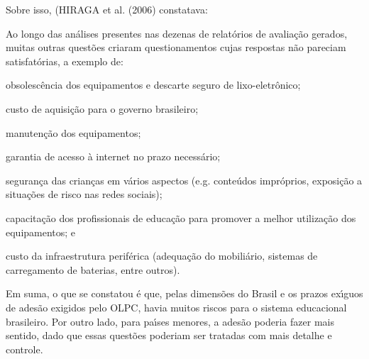 \documentclass[
12pt,		%
openright,	%
twoside,  %
a4paper,			%
chapter=TITLE,		%
english,			%
french,				%
spanish,			%
brazil				%
]{USPSC-classe/USPSC}
\begin{document}
Sobre isso, (HIRAGA et al. (2006) constatava:










\noindent\begin{center}\mbox{\centering{}}\end{center}


Ao longo das an\'alises presentes nas dezenas de relat\'orios de avalia\c{c}\~ao gerados, muitas outras quest\~oes criaram questionamentos cujas respostas n\~ao pareciam satisfat\'orias, a exemplo de:










\begin{alineas}
\item obsolesc\^encia dos equipamentos e descarte seguro de lixo-eletr\^onico;
\item custo de aquisi\c{c}\~ao para o governo brasileiro;
\item manuten\c{c}\~ao dos equipamentos;
\item garantia de acesso \`a internet no prazo necess\'ario;
\item seguran\c{c}a das crian\c{c}as em v\'arios aspectos (e.g. conte\'udos impr\'oprios, exposi\c{c}\~ao a situa\c{c}\~oes de risco nas redes sociais);
\item capacita\c{c}\~ao dos profissionais de educa\c{c}\~ao para promover a melhor utiliza\c{c}\~ao dos equipamentos; e
\item custo da infraestrutura perif\'erica (adequa\c{c}\~ao do mobili\'ario, sistemas de carregamento de baterias, entre outros).
\end{alineas}

Em suma, o que se constatou \'e que, pelas dimens\~oes do Brasil e os prazos ex\'{\i}guos de ades\~ao exigidos pelo OLPC, havia muitos riscos para o sistema educacional brasileiro. Por outro lado, para pa\'{\i}ses menores, a ades\~ao poderia fazer mais sentido, dado que essas quest\~oes poderiam ser tratadas com mais detalhe e controle.
\end{document}
